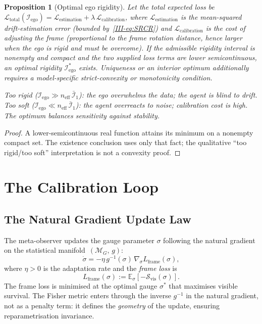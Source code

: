 \documentclass[12pt,a4paper,openany]{book}
\newtheorem{proposition}[theorem]{Proposition}
\begin{document}
\begin{proposition}[Optimal ego rigidity]
\label{III-prop:optimal_rigidity}
Let the total expected loss be
$\mathcal{L}_{\mathrm{total}}
(\mathcal{I}_{\mathrm{ego}})
= \mathcal{L}_{\mathrm{estimation}}
+ \lambda\,\mathcal{L}_{\mathrm{calibration}}$,
where $\mathcal{L}_{\mathrm{estimation}}$ is the
mean-squared drift-estimation error
(bounded by~\eqref{III-eq:SRCR}) and
$\mathcal{L}_{\mathrm{calibration}}$ is the cost of
adjusting the frame (proportional to the frame rotation
distance, hence larger when the ego is rigid and must be
overcome).
If the admissible rigidity interval is nonempty and compact and the two
supplied loss terms are lower semicontinuous, an optimal rigidity
$\mathcal{I}_{\mathrm{ego}}^*$ exists.  Uniqueness or an interior
optimum additionally requires a model-specific strict-convexity or
monotonicity condition.

\emph{Too rigid}
($\mathcal{I}_{\mathrm{ego}} \gg n_{\mathrm{eff}}\,\bar{\mathcal I}_1$):
the ego overwhelms the data; the agent is blind to drift.
\emph{Too soft}
($\mathcal{I}_{\mathrm{ego}} \ll n_{\mathrm{eff}}\,\bar{\mathcal I}_1$):
the agent overreacts to noise; calibration cost is high.
The optimum balances sensitivity against stability.
\end{proposition}

\begin{proof}
A lower-semicontinuous real function attains its minimum on a nonempty
compact set.  The existence conclusion uses only that fact; the
qualitative ``too rigid/too soft'' interpretation is not a convexity
proof.
\end{proof}

\section{The Calibration Loop}
\label{III-sec:loop}

\subsection{The Natural Gradient Update Law}
\label{III-subsec:update_law}

The meta-observer updates the gauge parameter $\sigma$
following the natural gradient on the statistical
manifold~$(\mathcal{M}_G,\,g)$:
\begin{equation}
\label{III-eq:update_law}
\dot{\sigma}
= -\eta\,g^{-1}(\sigma)\,
  \nabla_\sigma L_{\mathrm{frame}}(\sigma),
\end{equation}
where $\eta > 0$ is the adaptation rate and the
\emph{frame loss} is
\begin{equation}
\label{III-eq:frame_loss}
L_{\mathrm{frame}}(\sigma)
:= \mathbb{E}_\sigma\!\left[
  -\mathcal{S}_{\mathrm{vis}}(\sigma)\right].
\end{equation}
The frame loss is minimised at the optimal gauge
$\sigma^*$ that maximises visible survival.
The Fisher metric enters through the inverse $g^{-1}$
in the natural gradient, not as a penalty term:
it defines the \emph{geometry} of the update, ensuring
reparametrisation invariance.
\end{document}
